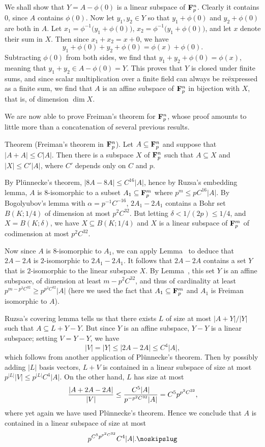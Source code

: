 \proof We shall show that $Y = A - \phi(0)$ is a linear subspace of ${\bf F}_p^n$. Clearly it contains $0$,
since $A$ contains $\phi(0)$. Now let $y_1,y_2\in Y$ so that $y_1 + \phi(0)$ and $y_2+\phi(0)$ are both in $A$.
Let $x_1 = \phi^{-1}\bigl(y_1+\phi(0)\bigr)$, $x_2 = \phi^{-1}\bigl(y_1+\phi(0)\bigr)$, and let $x$ denote
their sum in $X$. Then since $x_1 + x_2 = x+0$, we have
$$y_1 + \phi(0) + y_2 + \phi(0) = \phi(x) + \phi(0).$$
Subtracting $\phi(0)$ from both sides, we find that $y_1 + y_2 + \phi(0) = \phi(x)$, meaning
that $y_1 + y_2 \in A - \phi(0) = Y$. This proves that $Y$ is closed under finite sums, and since scalar
multiplication over a finite field can always be re\"expressed as a finite sum, we find that
$A$ is an affine subspace of ${\bf F}_p^n$ in bijection with $X$, that is, of dimension $\dim X$.\slug

We are now able to prove Freiman's theorem for ${\bf F}_p^n$, whose proof amounts to little more than
a concatenation of several previous results.

\parenproclaim Theorem {\advthm} (Freiman's theorem in ${\bf F}_p^n$). Let $A\subseteq {\bf F}_p^n$ and suppose
that $|A+A|\le C|A|$. Then there is a subspace $X$ of ${\bf F}_p^n$ such that $A\subseteq X$ and $|X|\le C'|A|$,
where $C'$ depends only on $C$ and $p$.

\proof By Pl\"unnecke's theorem, $|8A-8A| \le C^{16} |A|$, hence by Ruzsa's embedding lemma, $A$
is $8$-isomorphic to a subset $A_1\subseteq {\bf F}_p^m$ where $p^m \le pC^{16}|A|$. By Bogolyubov's lemma
with $\alpha = p^{-1}C^{-16}$, $2A_1 - 2A_1$ contains a Bohr set $B(K;1/4)$ of dimension at most
$p^2C^{32}$. But letting $\delta < 1/(2p) \le 1/4$, and $X = B(K;\delta)$, we have $X\subseteq B(K;1/4)$
and $X$ is a linear subspace of ${\bf F}_p^m$ of codimension at most $p^2C^{32}$.

Now since $A$ is $8$-isomorphic to $A_1$, we can apply Lemma~{\leminducedfreiman} to deduce that
$2A-2A$ is $2$-isomorphic to $2A_1 - 2A_1$. It follows that
$2A-2A$ contains a set $Y$ that is $2$-isomorphic to the linear subspace $X$. By Lemma~{\lemaffinefreiman},
this set $Y$ is an affine subspace, of dimension at least $m-p^2C^{32}$, and thus of cardinality
at least $p^{m-p^2C^{32}} \ge p^{p^2C^{32}}|A|$ (here we used the fact that $A_1\subseteq {\bf F}_p^m$ and
$A_1$ is Freiman isomorphic to $A$).

Ruzsa's covering lemma tells us that there exists $L$ of size at most $|A+Y|/|Y|$ such that $A\subseteq L+Y-Y$.
But since $Y$ is an affine subspace, $Y-Y$ is a linear subspace; setting $V = Y-Y$, we have
$$|V| = |Y| \le |2A-2A| \le C^4|A|,$$
which follows from another application of Pl\"unnecke's theorem.
Then by possibly adding $|L|$ basis vectors, $L+V$ is contained in a linear subspace of size at most $p^{|L|} |V|
\le p^{|L|} C^4|A|$.
On the other hand, $L$ has size at most
$${|A+2A-2A|\over |V|} \le {C^5|A| \over p^{-p^2C^{32}} |A|} = C^5p^{p^2C^{32}},$$
where yet again we have used Pl\"unnecke's theorem.
Hence we conclude that $A$ is contained in a linear subspace of size at most
$$ p^{C^5 p^{p^2C^{32}}} C^4|A|.\noskipslug$$

